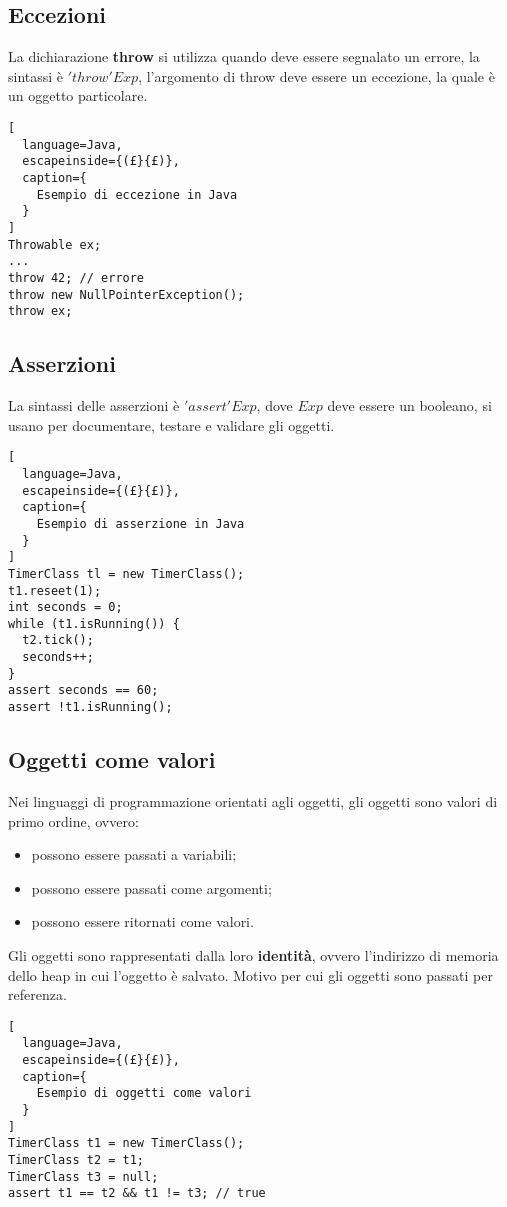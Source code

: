 \subsection{Eccezioni}
La dichiarazione \textbf{throw} si utilizza quando deve essere segnalato un
errore, la sintassi è $'throw'Exp$, l'argomento di throw deve essere un
eccezione, la quale è un oggetto particolare.
\begin{lstlisting}[
  language=Java,
  escapeinside={(£}{£)},
  caption={
    Esempio di eccezione in Java
  }
]
Throwable ex;
...
throw 42; // errore
throw new NullPointerException();
throw ex;
\end{lstlisting}

\subsection{Asserzioni}
La sintassi delle asserzioni è $'assert'Exp$, dove $Exp$ deve essere un
booleano, si usano per documentare, testare e validare gli oggetti.
\begin{lstlisting}[
  language=Java,
  escapeinside={(£}{£)},
  caption={
    Esempio di asserzione in Java
  }
]
TimerClass tl = new TimerClass();
t1.reseet(1);
int seconds = 0;
while (t1.isRunning()) {
  t2.tick();
  seconds++;
}
assert seconds == 60;
assert !t1.isRunning();
\end{lstlisting}

\subsection{Oggetti come valori}
Nei linguaggi di programmazione orientati agli oggetti, gli oggetti sono valori
di primo ordine, ovvero:
\begin{itemize}
  \item possono essere passati a variabili;
  \item possono essere passati come argomenti;
  \item possono essere ritornati come valori.
\end{itemize}

Gli oggetti sono rappresentati dalla loro \textbf{identità}, ovvero l'indirizzo
di memoria dello heap in cui l'oggetto è salvato.
Motivo per cui gli oggetti sono passati per referenza.
\begin{lstlisting}[
  language=Java,
  escapeinside={(£}{£)},
  caption={
    Esempio di oggetti come valori
  }
]
TimerClass t1 = new TimerClass();
TimerClass t2 = t1;
TimerClass t3 = null;
assert t1 == t2 && t1 != t3; // true
\end{lstlisting}

